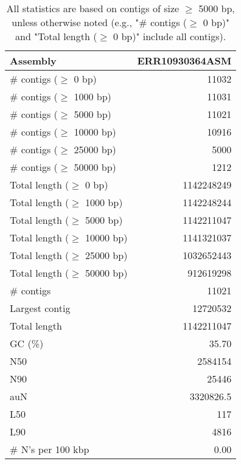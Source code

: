 \documentclass[12pt,a4paper]{article}
\begin{document}
\begin{table}[ht]
\begin{center}
\caption{All statistics are based on contigs of size $\geq$ 5000 bp, unless otherwise noted (e.g., "\# contigs ($\geq$ 0 bp)" and "Total length ($\geq$ 0 bp)" include all contigs).}
\begin{tabular}{|l*{1}{|r}|}
\hline
Assembly & ERR10930364ASM \\ \hline
\# contigs ($\geq$ 0 bp) & 11032 \\ \hline
\# contigs ($\geq$ 1000 bp) & 11031 \\ \hline
\# contigs ($\geq$ 5000 bp) & 11021 \\ \hline
\# contigs ($\geq$ 10000 bp) & 10916 \\ \hline
\# contigs ($\geq$ 25000 bp) & 5000 \\ \hline
\# contigs ($\geq$ 50000 bp) & 1212 \\ \hline
Total length ($\geq$ 0 bp) & 1142248249 \\ \hline
Total length ($\geq$ 1000 bp) & 1142248244 \\ \hline
Total length ($\geq$ 5000 bp) & 1142211047 \\ \hline
Total length ($\geq$ 10000 bp) & 1141321037 \\ \hline
Total length ($\geq$ 25000 bp) & 1032652443 \\ \hline
Total length ($\geq$ 50000 bp) & 912619298 \\ \hline
\# contigs & 11021 \\ \hline
Largest contig & 12720532 \\ \hline
Total length & 1142211047 \\ \hline
GC (\%) & 35.70 \\ \hline
N50 & 2584154 \\ \hline
N90 & 25446 \\ \hline
auN & 3320826.5 \\ \hline
L50 & 117 \\ \hline
L90 & 4816 \\ \hline
\# N's per 100 kbp & 0.00 \\ \hline
\end{tabular}
\end{center}
\end{table}
\end{document}

